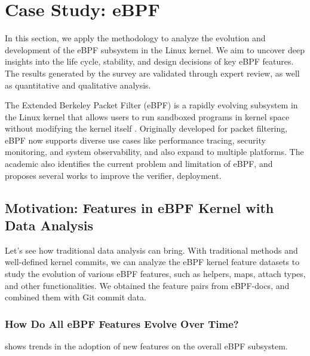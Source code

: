\section{Case Study: eBPF}

In this section, we apply the \emph{\sys} methodology to analyze the evolution and development of the eBPF subsystem in the Linux kernel. We aim to uncover deep insights into the life cycle, stability, and design decisions of key eBPF features. The results generated by the survey are validated through expert review, as well as quantitative and qualitative analysis.

The Extended Berkeley Packet Filter (eBPF)\cite{ebpf} is a rapidly evolving subsystem in the Linux kernel that allows users to run sandboxed programs in kernel space without modifying the kernel itself \cite{lim2024safebpf}. Originally developed for packet filtering, eBPF now supports diverse use cases like performance tracing, security monitoring, and system observability, and also expand to multiple platforms\cite{windows-ebpf, zheng2023bpftime}. The academic also identifies the current problem and limitation of eBPF, and proposes several works to improve the verifier, deployment.


\subsection{Motivation: Features in eBPF Kernel with Data Analysis}

Let's see how traditional data analysis can bring. With traditional methods and well-defined kernel commits, we can analyze the eBPF kernel feature datasets to study the evolution of various eBPF features, such as helpers, maps, attach types, and other functionalities. We obtained the feature pairs from eBPF-docs\cite{ebpfdocs}, and combined them with Git commit data.

\subsubsection{How Do All eBPF Features Evolve Over Time?}

 shows trends in the adoption of new features on the overall eBPF subsystem.

